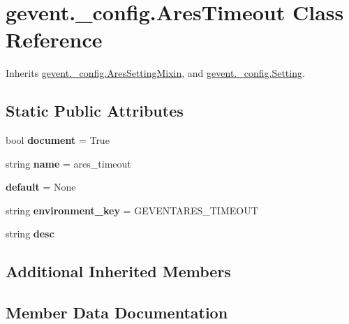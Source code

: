 \hypertarget{classgevent_1_1__config_1_1_ares_timeout}{}\section{gevent.\+\_\+config.\+Ares\+Timeout Class Reference}
\label{classgevent_1_1__config_1_1_ares_timeout}


Inherits \hyperlink{classgevent_1_1__config_1_1_ares_setting_mixin}{gevent.\+\_\+config.\+Ares\+Setting\+Mixin}, and \hyperlink{classgevent_1_1__config_1_1_setting}{gevent.\+\_\+config.\+Setting}.

\subsection*{Static Public Attributes}
\begin{DoxyCompactItemize}
\item 
\mbox{\label{classgevent_1_1__config_1_1_ares_timeout_a89ee0a6f44ba2f5106309fafa04de8f1}} 
bool {\bfseries document} = True
\item 
\mbox{\label{classgevent_1_1__config_1_1_ares_timeout_a12331af0ee11f9abf48eccfd3e1a573e}} 
string {\bfseries name} = \textquotesingle{}ares\+\_\+timeout\textquotesingle{}
\item 
\mbox{\label{classgevent_1_1__config_1_1_ares_timeout_acafb13a53c6dcfbbb822cac9df0b32fe}} 
{\bfseries default} = None
\item 
\mbox{\label{classgevent_1_1__config_1_1_ares_timeout_a1a7002e6243c68e092303a911e0d9460}} 
string {\bfseries environment\+\_\+key} = \textquotesingle{}G\+E\+V\+E\+N\+T\+A\+R\+E\+S\+\_\+\+T\+I\+M\+E\+O\+UT\textquotesingle{}
\item 
string {\bfseries desc}
\end{DoxyCompactItemize}
\subsection*{Additional Inherited Members}


\subsection{Member Data Documentation}
\mbox{\label{classgevent_1_1__config_1_1_ares_timeout_a14c4fbd211a8d26bd0a325ec4244546f}} 

